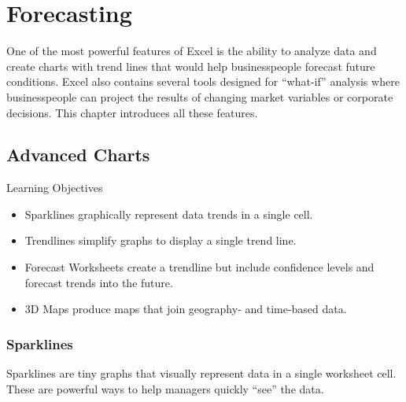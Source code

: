 \chapter{Forecasting}\label{ch08:forecasting}

One of the most powerful features of Excel is the ability to analyze data and create charts with trend lines that would help businesspeople forecast future conditions. Excel also contains several tools designed for ``what-if'' analysis where businesspeople can project the results of changing market variables or corporate decisions. This chapter introduces all these features. 

\section{Advanced Charts}

\begin{center}
	\begin{objbox}{Learning Objectives}
		\begin{itemize}
			\setlength{\itemsep}{0pt}
			\setlength{\parskip}{0pt}
			\setlength{\parsep}{0pt}
			
			\item Sparklines graphically represent data trends in a single cell.
			\item Trendlines simplify graphs to display a single trend line.
			\item Forecast Worksheets create a trendline but include confidence levels and forecast trends into the future.
			\item $ 3 $D Maps produce maps that join geography- and time-based data.

		\end{itemize}
	\end{objbox}
\end{center}

\subsection{Sparklines}

Sparklines are tiny graphs that visually represent data in a single worksheet cell. These are powerful ways to help managers quickly ``see'' the data.

